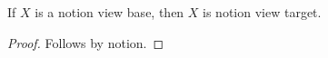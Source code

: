 

\begin{proposition}\label{notion_proof_unsupported_goal}
    If $X$ is a notion view base, then $X$ is notion view target.
\end{proposition}
\begin{proof}
    Follows by notion.
\end{proof}
